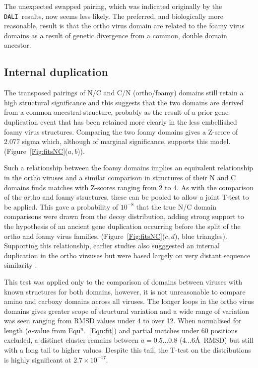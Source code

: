 \documentclass[preprint,12pt]{elsarticle}
\newcommand{\DALI}{{\tt DALI}}
\newcommand{\Fig}[1]{Figure~\ref{Fig:#1}}
\newcommand{\Eqn}[1]{Equ$^n$.~\ref{Eqn:#1}}
\begin{document}
The unexpected swapped pairing, which was indicated originally by the \DALI\ results, now seems
less likely.  The preferred, and biologically more reasonable, result is that the ortho virus
domain are related to the foamy virus domains as a result of genetic divergence from
a common, double domain ancestor.

\subsection{Internal duplication}

The transposed pairings of N/C and C/N (ortho/foamy) domains still retain a high structural
significance and this suggests that the two domains are derived from a common ancestral structure,
probably as the result of a prior gene-duplication event that has been retained more clearly
in the less embellished foamy virus structures.   Comparing the two foamy domains gives
a Z-score of 2.077 sigma which, although of marginal significance, supports this model.
(\Fig{fitsNC}($a,b$)).

Such a relationship between the foamy domains implies an equivalent relationship
in the ortho viruses and a similar comparison in structures of their N and C domains
finds matches with Z-scores ranging from 2 to 4.   As with the comparison of the
ortho and foamy structures, these can be pooled to allow a joint T-test to be applied.
This gave a probability of $10^{-8}$ that the true N/C domain
comparisons were drawn from the decoy distribution, adding strong support to the
hypothesis of an ancient gene duplication occurring before the split of the ortho
and foamy virus families. (\Fig{fitsNC}($c,d$), blue triangles).
Supporting this relationship, earlier studies also sugggested an internal duplication
in the ortho virsuses but were based largely on very distant sequence similarity
\cite{CampillosMet06}.

This test was applied only to the comparison of domains between viruses with
known structures for both domains, however, it is not unreasonable to compare
amino and carboxy domains across all viruses.  The longer loops in the ortho virus
domains gives greater scope of structural variation and a wide range of variation
was seen ranging from RMSD values under 4 to over 12.
When normalised for length ($a$-value from \Eqn{fit}) and partial matches under
60 positions excluded, a distinct cluster remains between $a=0.5\ldots0.8$ (4...6\AA\
RMSD) but still with a long tail to higher values.
Despite this tail, the T-test on the distributions is highly significant at $2.7 \times 10^{-17}$.
\end{document}
